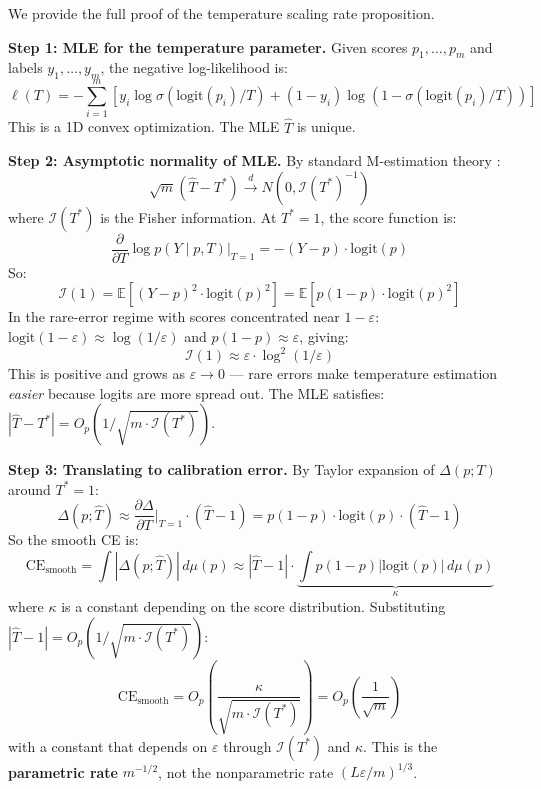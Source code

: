 \documentclass{article}
\newcommand{\CE}{\mathrm{CE}}
\newcommand{\Lip}{L}
\newcommand{\errrate}{\varepsilon}
\newcommand{\nsamples}{m}
\newcommand{\calmap}{\Delta}
\newcommand{\scoredist}{\mu}
\providecommand{\E}{}
\renewcommand{\E}{\mathbb{E}}
\newcommand{\FisherI}{\mathcal{I}}
\newcommand{\logit}{\mathrm{logit}}
\providecommand{\sigmoid}{}
\renewcommand{\sigmoid}{\sigma}
\theoremstyle{definition}
\begin{document}
We provide the full proof of the temperature scaling rate proposition.

\textbf{Step 1: MLE for the temperature parameter.}
Given scores $p_1, \ldots, p_{\nsamples}$ and labels $y_1, \ldots, y_{\nsamples}$, the negative log-likelihood is:
\begin{equation}
\ell(T) = -\sum_{i=1}^{\nsamples} \left[ y_i \log \sigmoid(\logit(p_i)/T) + (1 - y_i) \log(1 - \sigmoid(\logit(p_i)/T)) \right]
\end{equation}
This is a 1D convex optimization. The MLE $\hat{T}$ is unique.

\textbf{Step 2: Asymptotic normality of MLE.}
By standard M-estimation theory \citep{vandervaart1998asymptotic}:
\begin{equation}
\sqrt{\nsamples}(\hat{T} - T^*) \xrightarrow{d} N(0, \FisherI(T^*)^{-1})
\end{equation}
where $\FisherI(T^*)$ is the Fisher information. At $T^* = 1$, the score function is:
\begin{equation}
\frac{\partial}{\partial T} \log p(Y \mid p, T) \bigg|_{T=1} = -(Y - p) \cdot \logit(p)
\end{equation}
So:
\begin{equation}
\FisherI(1) = \E[(Y - p)^2 \cdot \logit(p)^2] = \E[p(1-p) \cdot \logit(p)^2]
\end{equation}
In the rare-error regime with scores concentrated near $1 - \errrate$: $\logit(1-\errrate) \approx \log(1/\errrate)$ and $p(1-p) \approx \errrate$, giving:
\begin{equation}
\FisherI(1) \approx \errrate \cdot \log^2(1/\errrate)
\end{equation}
This is positive and grows as $\errrate \to 0$ --- rare errors make temperature estimation \emph{easier} because logits are more spread out. The MLE satisfies: $|\hat{T} - T^*| = O_p(1/\sqrt{\nsamples \cdot \FisherI(T^*)})$.

\textbf{Step 3: Translating to calibration error.}
By Taylor expansion of $\calmap(p; T)$ around $T^* = 1$:
\begin{equation}
\calmap(p; \hat{T}) \approx \frac{\partial \calmap}{\partial T}\bigg|_{T=1} \cdot (\hat{T} - 1) = p(1-p) \cdot \logit(p) \cdot (\hat{T} - 1)
\end{equation}
So the smooth CE is:
\begin{equation}
\CE_{\mathrm{smooth}} = \int |\calmap(p; \hat{T})| \, d\scoredist(p) \approx |\hat{T} - 1| \cdot \underbrace{\int p(1-p) |\logit(p)| \, d\scoredist(p)}_{\kappa}
\end{equation}
where $\kappa$ is a constant depending on the score distribution. Substituting $|\hat{T} - 1| = O_p(1/\sqrt{\nsamples \cdot \FisherI(T^*)})$:
\begin{equation}
\CE_{\mathrm{smooth}} = O_p\left(\frac{\kappa}{\sqrt{\nsamples \cdot \FisherI(T^*)}}\right) = O_p\left(\frac{1}{\sqrt{\nsamples}}\right)
\end{equation}
with a constant that depends on $\errrate$ through $\FisherI(T^*)$ and $\kappa$. This is the \textbf{parametric rate} $\nsamples^{-1/2}$, not the nonparametric rate $(\Lip\errrate/\nsamples)^{1/3}$.
\end{document}
